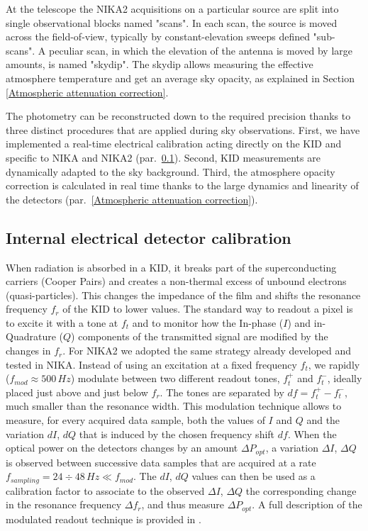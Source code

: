 \documentclass[]{aa} %
\begin{document}
At the telescope the NIKA2 acquisitions on a particular source are split into single observational blocks named "scans". In each scan, the source is moved across the field-of-view, typically by constant-elevation sweeps defined "sub-scans". A peculiar scan, in which the elevation of the antenna is moved by large amounts, is named "skydip". The skydip allows measuring the effective atmosphere temperature and get an average sky opacity, as explained in Section \ref{Atmospheric attenuation correction}.

The photometry can be reconstructed down to the required precision thanks to three distinct procedures that are applied during sky observations. First, we have implemented a real-time electrical calibration acting directly on the KID and specific to NIKA and NIKA2 (par.~\ref{Internal detectors calibration}). Second, KID measurements are dynamically adapted to the sky background. Third, the atmosphere opacity correction is calculated in real time thanks to the large dynamics and linearity of the detectors (par.~\ref{Atmospheric attenuation correction}).



\subsection{Internal electrical detector calibration}
\label{Internal detectors calibration}

When radiation is absorbed in a KID, it breaks part of the superconducting carriers (Cooper Pairs) and creates a non-thermal excess of unbound electrons (quasi-particles). This changes the impedance of the film and shifts the resonance frequency $f_r$ of the KID to lower values.
The standard way to readout a pixel is to excite it with a tone at $f_t$ and to monitor how the In-phase ($I$) and in-Quadrature ($Q$) components of the transmitted signal are modified by the changes in $f_r$. For NIKA2 we adopted the same strategy already developed and tested in NIKA. Instead of using an excitation at a fixed frequency $f_t$, we rapidly ($f_{mod} \approx 500\,Hz$) modulate between two different readout tones, $f_t^+$ and $f_t^-$, ideally placed just above and just below $f_r$. The tones are separated by $df=f_t^+-f_t^-$, much smaller than the resonance width. This modulation technique allows to measure, for every acquired data sample, both the values of $I$ and $Q$ and the variation $dI$, $dQ$ that is induced by the chosen frequency shift $df$. When the optical power on the detectors changes by an amount $\Delta P_{opt}$, a variation $\Delta I$, $\Delta Q$ is observed between successive data samples that are acquired at a rate $f_{sampling} = 24\div48\,Hz \ll  f_{mod} $. The $dI$, $dQ$ values can then be used as a calibration factor to associate to the observed $\Delta I$, $\Delta Q$ the corresponding change in the resonance frequency $\Delta f_r$, and thus measure $\Delta P_{opt}$. A full description of the modulated readout technique is provided in \cite{Calvo2013}.
\end{document}
